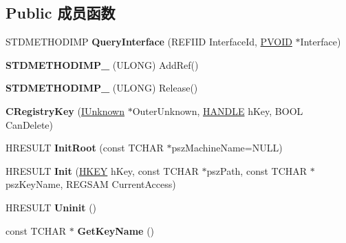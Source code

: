 \subsection*{Public 成员函数}
\begin{DoxyCompactItemize}
\item 
\mbox{\label{class_c_registry_key_a0934ed6e130866fc65cea317763e0e88}} 
S\+T\+D\+M\+E\+T\+H\+O\+D\+I\+MP {\bfseries Query\+Interface} (R\+E\+F\+I\+ID Interface\+Id, \hyperlink{interfacevoid}{P\+V\+O\+ID} $\ast$Interface)
\item 
\mbox{\label{class_c_registry_key_ab2cf7fcba5c3a910966a7a46eeb6db18}} 
{\bfseries S\+T\+D\+M\+E\+T\+H\+O\+D\+I\+M\+P\+\_\+} (U\+L\+O\+NG) Add\+Ref()
\item 
\mbox{\label{class_c_registry_key_a783cb3d521dfea36a130671ab3c264ad}} 
{\bfseries S\+T\+D\+M\+E\+T\+H\+O\+D\+I\+M\+P\+\_\+} (U\+L\+O\+NG) Release()
\item 
\mbox{\label{class_c_registry_key_a277c5685f5a9bedb12289c9126b4adde}} 
{\bfseries C\+Registry\+Key} (\hyperlink{interface_i_unknown}{I\+Unknown} $\ast$Outer\+Unknown, \hyperlink{interfacevoid}{H\+A\+N\+D\+LE} h\+Key, B\+O\+OL Can\+Delete)
\item 
\mbox{\label{class_c_registry_key_adca8004af3a4f5570158af9630e23ee3}} 
H\+R\+E\+S\+U\+LT {\bfseries Init\+Root} (const T\+C\+H\+AR $\ast$psz\+Machine\+Name=N\+U\+LL)
\item 
\mbox{\label{class_c_registry_key_ac65eece70736d1fcd5630be36f932281}} 
H\+R\+E\+S\+U\+LT {\bfseries Init} (\hyperlink{interfacevoid}{H\+K\+EY} h\+Key, const T\+C\+H\+AR $\ast$psz\+Path, const T\+C\+H\+AR $\ast$psz\+Key\+Name, R\+E\+G\+S\+AM Current\+Access)
\item 
\mbox{\label{class_c_registry_key_a3ec1705c55332b32fa19f607bd340176}} 
H\+R\+E\+S\+U\+LT {\bfseries Uninit} ()
\item 
\mbox{\label{class_c_registry_key_a25b42ba050ec3f8c812ec7de35927b36}} 
const T\+C\+H\+AR $\ast$ {\bfseries Get\+Key\+Name} ()
\item 

\end{DoxyCompactItemize}
